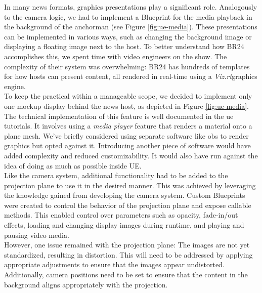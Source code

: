 \documentclass[
  a4paper,  %
  twoside,  %
  bibliography=totoc,
  headsepline,
  cleardoublepage=empty,
  parskip=half,
  draft=false
]{scrbook}
\begin{document}
In many news formats, graphics presentations play a significant role. Analogously to the camera logic, we had to implement a Blueprint for the media playback in the background of the anchorman (see Figure \ref{fig:ue-media}). These presentations can be implemented in various ways, such as changing the background image or displaying a floating image next to the host. To better understand how BR24 accomplishes this, we spent time with video engineers on the show. The complexity of their system was overwhelming: BR24 has hundreds of templates for how hosts can present content, all rendered in real-time using a \textit{Viz.rt}graphics engine. \\
To keep the practical within a manageable scope, we decided to implement only one mockup display behind the news host, as depicted in Figure \ref{fig:ue-media}. The technical implementation of this feature is well documented in the \gls{ue} tutorials. It involves using a \textit{media player} feature that renders a material onto a plane mesh. We've briefly considered using separate software like \gls{obs} to render graphics but opted against it. Introducing another piece of software would have added complexity and reduced customizability. It would also have run against the idea of doing as much as possible inside UE. \\
Like the camera system, additional functionality had to be added to the projection plane to use it in the desired manner. This was achieved by leveraging the knowledge gained from developing the camera system. Custom Blueprints were created to control the behavior of the projection plane and expose callable methods. This enabled control over parameters such as opacity, fade-in/out effects, loading and changing display images during runtime, and playing and pausing video media. \\
However, one issue remained with the projection plane: The images are not yet standardized, resulting in distortion. This will need to be addressed by applying appropriate adjustments to ensure that the images appear undistorted. Additionally, camera positions need to be set to ensure that the content in the background aligns appropriately with the projection.
\end{document}
